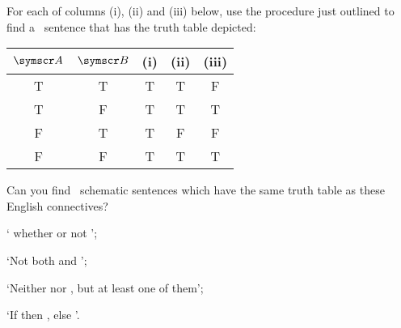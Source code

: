 
\practiceproblems

\problempart
\label{pr.dnf}
For  each of  columns (i), (ii) and (iii) below, use the procedure just outlined to find a \TFL\ sentence that has the truth table depicted:
\begin{center}
\begin{tabular}{c c|c| c | c } \toprule 
$\meta{A}$&$\meta{B}$& (i) &  (ii) & (iii) \\
\midrule
 T & T &  T & T & F \\
 T & F &  T & T & T\\
 F & T &  T & F & F\\
 F & F &  T & T & T \\
 \bottomrule
\end{tabular}
\end{center} 


\problempart
\label{pr.dnf2}
Can you find \TFL\ schematic sentences which have the same truth table as these English connectives?
\begin{earg}
\item ` whether or not ';
\item `Not both  and ';
\item `Neither  nor , but at least one of them';
\item `If  then , else '.
\end{earg}

